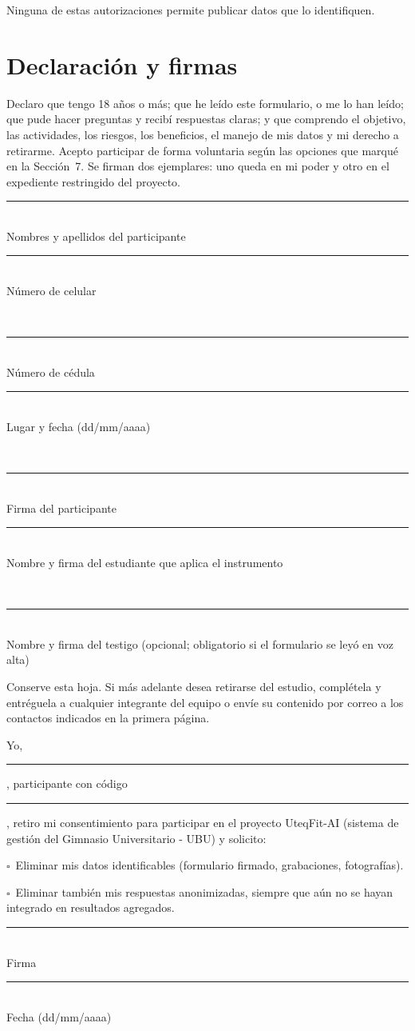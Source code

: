 \documentclass[11pt,a4paper]{article}
\newcommand{\caja}{$\square$}
\begin{document}
Ninguna de estas autorizaciones permite publicar datos que lo identifiquen.

\section{Declaración y firmas}
Declaro que tengo 18 años o más; que he leído este formulario, o me lo han leído; que pude hacer preguntas y recibí respuestas claras; y que comprendo el objetivo, las actividades, los riesgos, los beneficios, el manejo de mis datos y mi derecho a retirarme. Acepto participar de forma voluntaria según las opciones que marqué en la Sección~7. Se firman dos ejemplares: uno queda en mi poder y otro en el expediente restringido del proyecto.

\vspace{1.4cm}
\newcommand{\firma}[1]{\parbox[t]{0.46\linewidth}{\centering\rule{\linewidth}{0.4pt}\\\small #1}}
\firma{Nombres y apellidos del participante}\hfill\firma{Número de celular}\\[1.1cm]
\firma{Número de cédula}\hfill\firma{Lugar y fecha (dd/mm/aaaa)}\\[1.1cm]
\firma{Firma del participante}\hfill\firma{Nombre y firma del estudiante que aplica el instrumento}\\[1.1cm]
\begin{center}\firma{Nombre y firma del testigo (opcional; obligatorio si el formulario se leyó en voz alta)}\end{center}

\clearpage
\begin{tcolorbox}[enhanced,colback=white,colframe=verde,arc=2mm,boxrule=0.6pt,borderline={0.6pt}{0pt}{verde,dashed},
  title={\bfseries 9. Revocación del consentimiento (opcional) --- desprendible para el participante},coltitle=white,colbacktitle=verde]
\setlength{\parskip}{6pt}
Conserve esta hoja. Si más adelante desea retirarse del estudio, complétela y entréguela a cualquier integrante del equipo o envíe su contenido por correo a los contactos indicados en la primera página.

Yo, \rule{6cm}{0.4pt}, participante con código \rule{2.5cm}{0.4pt}, retiro mi consentimiento para participar en el proyecto UteqFit-AI (sistema de gestión del Gimnasio Universitario - UBU) y solicito:

\hspace{0.5cm}\caja\ Eliminar mis datos identificables (formulario firmado, grabaciones, fotografías).

\hspace{0.5cm}\parbox[t]{0.92\linewidth}{\caja\ Eliminar también mis respuestas anonimizadas, siempre que aún no se hayan integrado en resultados agregados.}

\vspace{1.2cm}
\firma{Firma}\hfill\firma{Fecha (dd/mm/aaaa)}
\end{tcolorbox}
\end{document}
